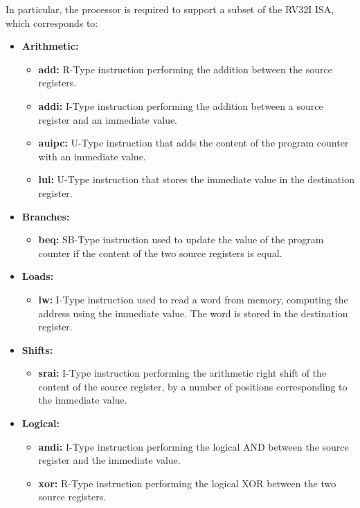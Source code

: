 In particular, the processor is required to support a subset of the RV32I ISA, which corresponds to:
\begin{itemize}
    \item \textbf{Arithmetic:}
    \begin{itemize}
        \item \textbf{add:} R-Type instruction performing the addition between the source registers.
        \item \textbf{addi:} I-Type instruction performing the addition between a source register and an immediate value.
        \item \textbf{auipc:} U-Type instruction that adds the content of the program counter with an immediate value.
        \item \textbf{lui:} U-Type instruction that stores the immediate value in the destination register.
    \end{itemize}
    \item \textbf{Branches:}
    \begin{itemize}
        \item \textbf{beq:} SB-Type instruction used to update the value of the program counter if the content of the two source registers is equal.
    \end{itemize}
    \item \textbf{Loads:}
    \begin{itemize}
        \item \textbf{lw:} I-Type instruction used to read a word from memory, computing the address using the immediate value. The word is stored in the destination register.
    \end{itemize}
    \item \textbf{Shifts:}
    \begin{itemize}
        \item \textbf{srai:} I-Type instruction performing the arithmetic right shift of the content of the source register, by a number of positions corresponding to the immediate value.
    \end{itemize}
    \item \textbf{Logical:}
    \begin{itemize}
        \item \textbf{andi:} I-Type instruction performing the logical AND between the source register and the immediate value.
        \item \textbf{xor:} R-Type instruction performing the logical XOR between the two source registers.
    \end{itemize}

\end{itemize}
